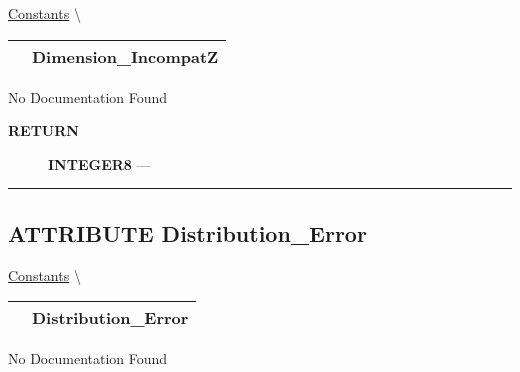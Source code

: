 \hypertarget{ecldoc:pbblas.constants.dimension_incompatz}{}
\hspace{0pt} \hyperlink{ecldoc:PBblas.Constants}{Constants} \textbackslash 

{\renewcommand{\arraystretch}{1.5}
\begin{tabularx}{\textwidth}{|>{\raggedright\arraybackslash}l|X|}
\hline
\hspace{0pt}\mytexttt{\color{red} } & \textbf{Dimension\_IncompatZ} \\
\hline
\end{tabularx}
}

\par





No Documentation Found








\par
\begin{description}
\item [\colorbox{tagtype}{\color{white} \textbf{\textsf{RETURN}}}] \textbf{INTEGER8} --- 
\end{description}




\rule{\linewidth}{0.5pt}
\subsection*{\textsf{\colorbox{headtoc}{\color{white} ATTRIBUTE}
Distribution\_Error}}

\hypertarget{ecldoc:pbblas.constants.distribution_error}{}
\hspace{0pt} \hyperlink{ecldoc:PBblas.Constants}{Constants} \textbackslash 

{\renewcommand{\arraystretch}{1.5}
\begin{tabularx}{\textwidth}{|>{\raggedright\arraybackslash}l|X|}
\hline
\hspace{0pt}\mytexttt{\color{red} } & \textbf{Distribution\_Error} \\
\hline
\end{tabularx}
}

\par





No Documentation Found








